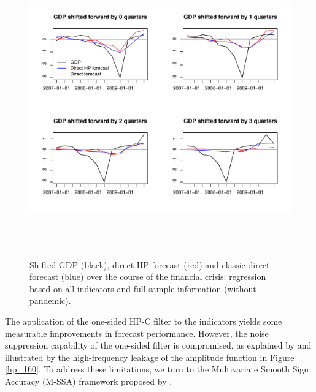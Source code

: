 \documentclass[11pt,a4paper]{article}
\begin{document}
\begin{figure}[H]
    \begin{center}
        \includegraphics[height=5in, width=6in]{./Figures/direct_hp_forecasts_financial_crisis.pdf}
        \caption{Shifted GDP (black), direct HP forecast (red) and classic direct forecast (blue) over the course of the financial crisis: regression based on all indicators and full sample information (without pandemic).
        \label{direct_hp_forecasts_financial_crisis}}
    \end{center}
\end{figure}



The application of the one-sided HP-C filter to the indicators yields some measurable improvements in forecast performance. However, 
the noise suppression capability of the one-sided filter is compromised, as explained by \cite{Wildi2025} and illustrated by the high-frequency leakage of the amplitude function in Figure \eqref{hp_160}. To address these limitations, we turn to the Multivariate Smooth Sign Accuracy (M-SSA) framework proposed by \cite{Wildi2025}.
\end{document}
